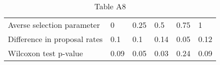 \begin{table}[ht]
\centering
\begin{tabular}{llllll}
  \hline
  \hline
Averse selection parameter & 0 & 0.25 & 0.5 & 0.75 & 1 \\ 
  Difference in proposal rates & 0.1 & 0.1 & 0.14 & 0.05 & 0.12 \\ 
  Wilcoxon test p-value & 0.09 & 0.05 & 0.03 & 0.24 & 0.09 \\ 
   \hline
\end{tabular}
\caption{Table A8} 
\end{table}

